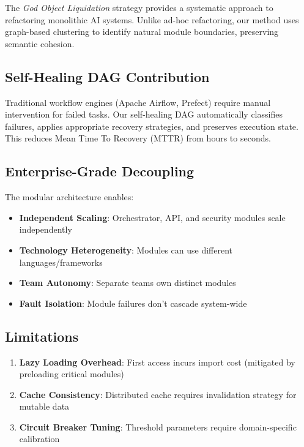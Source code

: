 \documentclass[conference]{IEEEtran}
\begin{document}
The \textit{God Object Liquidation} strategy provides a systematic approach to refactoring monolithic AI systems. Unlike ad-hoc refactoring, our method uses graph-based clustering to identify natural module boundaries, preserving semantic cohesion.

\subsection{Self-Healing DAG Contribution}

Traditional workflow engines (Apache Airflow, Prefect) require manual intervention for failed tasks. Our self-healing DAG automatically classifies failures, applies appropriate recovery strategies, and preserves execution state. This reduces Mean Time To Recovery (MTTR) from hours to seconds.

\subsection{Enterprise-Grade Decoupling}

The modular architecture enables:
\begin{itemize}
    \item \textbf{Independent Scaling}: Orchestrator, API, and security modules scale independently
    \item \textbf{Technology Heterogeneity}: Modules can use different languages/frameworks
    \item \textbf{Team Autonomy}: Separate teams own distinct modules
    \item \textbf{Fault Isolation}: Module failures don't cascade system-wide
\end{itemize}

\subsection{Limitations}

\begin{enumerate}
    \item \textbf{Lazy Loading Overhead}: First access incurs import cost (mitigated by preloading critical modules)
    \item \textbf{Cache Consistency}: Distributed cache requires invalidation strategy for mutable data
    \item \textbf{Circuit Breaker Tuning}: Threshold parameters require domain-specific calibration
\end{enumerate}
\end{document}
